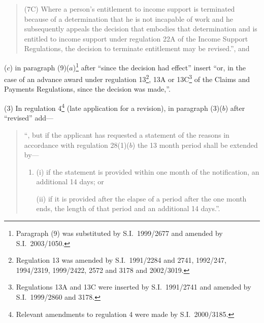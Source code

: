 \documentclass[12pt,a4paper]{article}
\begin{document}
\begin{enumerate}
\begin{quotation}
(7C) Where a person’s entitlement to income support is terminated because of a determination that he is not incapable of work and he subsequently appeals the decision that embodies that determination and is entitled to income support under regulation 22A of the Income Support Regulations, the decision to terminate entitlement may be revised.”, and
\end{quotation}

($c$) in paragraph (9)($a$)\footnote{Paragraph (9) was substituted by S.I.\ 1999/2677 and amended by S.I.\ 2003/1050.} after “since the decision had effect” insert “or, in the case of an advance award under regulation 13\footnote{Regulation 13 was amended by S.I.\ 1991/2284 and 2741, 1992/247, 1994/2319, 1999/2422, 2572 and 3178 and 2002/3019.}, 13A or 13C\footnote{Regulations 13A and 13C were inserted by S.I.\ 1991/2741 and amended by S.I.\ 1999/2860 and 3178.} of the Claims and Payments Regulations, since the decision was made,”.
\end{enumerate}

(3) In regulation 4\footnote{Relevant amendments to regulation 4 were made by S.I.\ 2000/3185.} (late application for a revision), in paragraph (3)($b$)  after “revised” add—
\begin{quotation}
“, but if the applicant has requested a statement of the reasons in accordance with regulation 28(1)($b$)  the 13 month period shall be extended by—
\begin{enumerate}\item[]
(i) if the statement is provided within one month of the notification, an additional 14 days; or

(ii) if it is provided after the elapse of a period after the one month ends, the length of that period and an additional 14 days.”.
\end{enumerate}
\end{quotation}
\end{document}
